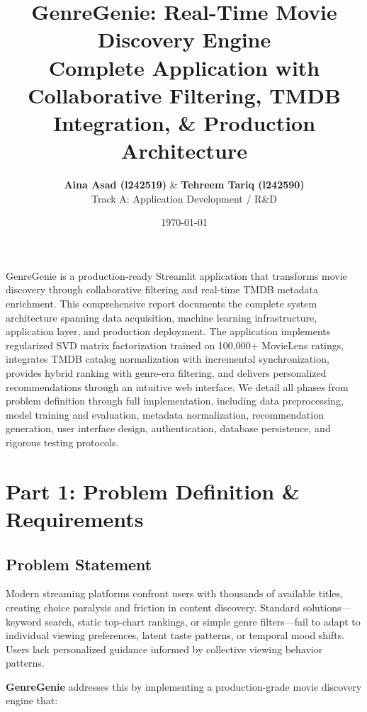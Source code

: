 \documentclass[11pt,a4paper]{article}
\title{\color{purpleDark}\textbf{GenreGenie: Real-Time Movie Discovery Engine}\\ \large\color{purpleGray} Complete Application with Collaborative Filtering, TMDB Integration, \& Production Architecture}
\author{\textbf{Aina Asad (l242519)} \& \textbf{Tehreem Tariq (l242590)} \\ Track A: Application Development / R\&D}
\date{\today}
\renewenvironment{abstract}{%
\begin{tcolorbox}[enhanced, breakable, arc=4pt, boxrule=0.8pt,
  colback=purpleLight, colframe=purpleDark,
  title=Abstract, fonttitle=\sffamily\bfseries\small,
  coltitle=white, colbacktitle=purpleDark,
  left=8pt, right=8pt, top=6pt, bottom=6pt,
  before skip=10pt, after skip=14pt]\small
}{\end{tcolorbox}}
\begin{document}
\maketitle
\vspace{-0.5em}

\begin{abstract}
GenreGenie is a production-ready Streamlit application that transforms movie discovery through collaborative filtering and real-time TMDB metadata enrichment. This comprehensive report documents the complete system architecture spanning data acquisition, machine learning infrastructure, application layer, and production deployment. The application implements regularized SVD matrix factorization trained on 100,000+ MovieLens ratings, integrates TMDB catalog normalization with incremental synchronization, provides hybrid ranking with genre-era filtering, and delivers personalized recommendations through an intuitive web interface. We detail all phases from problem definition through full implementation, including data preprocessing, model training and evaluation, metadata normalization, recommendation generation, user interface design, authentication, database persistence, and rigorous testing protocols.
\end{abstract}

\tableofcontents
\newpage


\section{Part 1: Problem Definition \& Requirements}

\subsection{Problem Statement}

Modern streaming platforms confront users with thousands of available titles, creating choice paralysis and friction in content discovery. Standard solutions—keyword search, static top-chart rankings, or simple genre filters—fail to adapt to individual viewing preferences, latent taste patterns, or temporal mood shifts. Users lack personalized guidance informed by collective viewing behavior patterns.

\textbf{GenreGenie} addresses this by implementing a production-grade movie discovery engine that:
\end{document}
